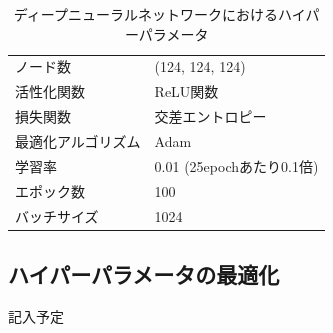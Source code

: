 \begin{table}[H]
 \centering
  \begin{tabular}{ l  l }
   \hline
   ノード数 & (124, 124, 124)\\
   活性化関数 & ReLU関数\\
   損失関数 & 交差エントロピー\\
   最適化アルゴリズム & Adam\\
   学習率 & 0.01 (25epochあたり0.1倍)\\
   エポック数 & 100\\
   バッチサイズ & 1024\\
   \hline
  \end{tabular}
  \caption{ディープニューラルネットワークにおけるハイパーパラメータ}
  \label{dnnsetting}
\end{table}
\subsection{ハイパーパラメータの最適化}
記入予定
